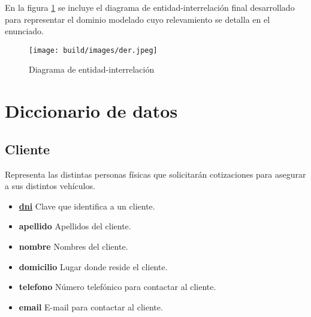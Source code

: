 \documentclass[a4paper,11pt]{article}
\begin{document}
 En la figura \ref{fig:der} se incluye el diagrama de entidad-interrelación
 final desarrollado para representar el dominio modelado cuyo relevamiento se
 detalla en el enunciado.

\begin{figure}[h!t]
  \centering
  \texttt{[image: build/images/der.jpeg]}
  \caption{Diagrama de entidad-interrelación} \label{fig:der}
\end{figure}

\FloatBarrier





  

\section{Diccionario de datos}

\subsection{Cliente}

Representa las distintas personas físicas que solicitarán cotizaciones para asegurar 
a sus distintos vehículos.

\begin{itemize}

  \item \textbf{\uline{dni}} Clave que identifica a un cliente.
  
  \item \textbf{apellido} Apellidos del cliente.

  \item \textbf{nombre} Nombres del cliente.
  
  \item \textbf{domicilio} Lugar donde reside el cliente.
  
  \item \textbf{telefono} Número telefónico para contactar al cliente.
  
  \item \textbf{email} E-mail para contactar al cliente.
  
\end{itemize}
\end{document}

